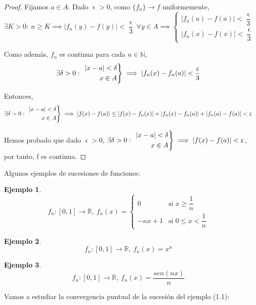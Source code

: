 \documentclass[11pt, a4paper]{article}
\let\epsilon\upvarepsilon
\providecommand{\abs}[1]{\lvert#1\rvert}
\newcommand{\R}{\mathbb{R}}
\newcommand{\N}{\mathbb{N}}
\newcommand{\fn}{\{f_n\}}
\theoremstyle{theorem-style}
\theoremstyle{definition-style}
\theoremstyle{remark-style}
\theoremstyle{example-style}
\newtheorem{ejemplo}{Ejemplo}[section]
\newenvironment{rcases}
  {\left.\begin{aligned}}
  {\end{aligned}\right\rbrace}
\begin{document}
\begin{proof}
	Fijamos $a\in A$. Dado $\epsilon>0$, como $\fn\to f$ uniformemente,
	\[
	\exists K>0:\ n\ge K \implies \abs{f_n(y)-f(y)}<\dfrac{\epsilon}{3}\ \forall y\in A \implies \begin{cases}
	\abs{f_n(a)-f(a)}<\dfrac{\epsilon}{3}\\
	\abs{f_n(x)-f(x)}<\dfrac{\epsilon}{3}
\end{cases}
	\]
	
	Como además, $f_n$ es continua para cada $n\in \N$,
	\[
	\exists \delta>0:\ \begin{rcases}
	\abs{x-a}<\delta\\
	x\in A
\end{rcases} \implies \abs{f_n(x)-f_n(a)} < \dfrac{\epsilon}{3}
	\] 
	
	Entonces,
	\[
	\exists \delta>0:\ \begin{rcases}
	\abs{x-a}<\delta\\
	x\in A
\end{rcases} \implies \abs{f(x)-f(a)} \le \abs{f(x)-f_n(x)} + \abs{f_n(x)-f_n(a)}+\abs{f_n(a)-f(a)} < \epsilon
	\]
	
	Hemos probado que dado $\epsilon > 0$, $\exists \delta>0:\ \begin{rcases}
	\abs{x-a}<\delta\\
	x\in A
	\end{rcases} \implies \abs{f(x)-f(a)}<\epsilon$, por tanto, f es continua. 
\end{proof}

Algunos ejemplos de sucesiones de funciones:

\begin{ejemplo}
	\[
		f_n : [0,1] \to \R,\ f_n(x) = \begin{cases}
	         0 & \text{si } x\ge \dfrac{1}{n}\\
	         -nx+1 & \text{si } 0\le x < \dfrac{1}{n}
\end{cases}
	\]
\end{ejemplo}

\begin{ejemplo}
	\[
	f_n : [0,1] \to \R,\ f_n(x) = x^n
	\]
\end{ejemplo}

\begin{ejemplo}
	\[
	f_n : [0,1] \to \R,\ f_n(x) = \dfrac{sen(nx)}{n}
	\]
\end{ejemplo}


Vamos a estudiar la convergencia puntual de la sucesión del ejemplo (1.1):
\end{document}
